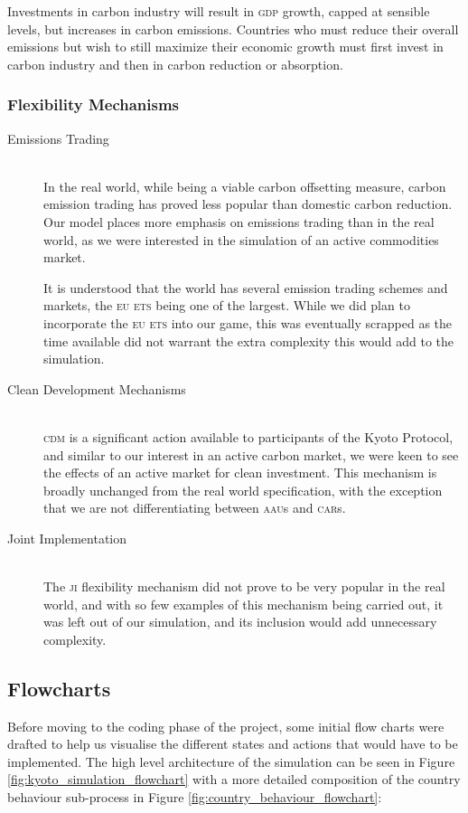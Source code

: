\begin{description}
Investments in carbon industry will result in \textsc{gdp} growth, capped at sensible levels, but increases in carbon emissions. Countries who must reduce their overall emissions but wish to still maximize their economic growth must first invest in carbon industry and then in carbon reduction or absorption.
\end{description}

\subsubsection{Flexibility Mechanisms}
\begin{description}
	\item [Emissions Trading] \hfill \\ In the real world, while being a viable carbon offsetting measure, carbon emission trading has proved less popular than domestic carbon reduction. Our model places more emphasis on emissions trading than in the real world, as we were interested in the simulation of an active commodities market.

It is understood that the world has several emission trading schemes and markets, the \textsc{eu ets} being one of the largest. While we did plan to incorporate the \textsc{eu ets} into our game, this was eventually scrapped as the time available did not warrant the extra complexity this would add to the simulation.
	\item [Clean Development Mechanisms] \hfill \\ \textsc{cdm} is a significant action available to participants of the Kyoto Protocol, and similar to our interest in an active carbon market, we were keen to see the effects of an active market for clean investment. This mechanism is broadly unchanged from the real world specification, with the exception that we are not differentiating between \textsc{aau}s and \textsc{car}s.
	\item [Joint Implementation] \hfill \\ The \textsc{ji} flexibility mechanism did not prove to be very popular in the real world, and with so few examples of this mechanism being carried out, it was left out of our simulation, and its inclusion would add unnecessary complexity.
\end{description}	
	
\subsection{Flowcharts}
Before moving to the coding phase of the project, some initial flow charts were drafted to help us visualise the different states and actions that would have to be implemented. The high level architecture of the simulation can be seen in Figure \ref{fig:kyoto_simulation_flowchart} with a more detailed composition of the country behaviour sub-process in Figure \ref{fig:country_behaviour_flowchart}:

